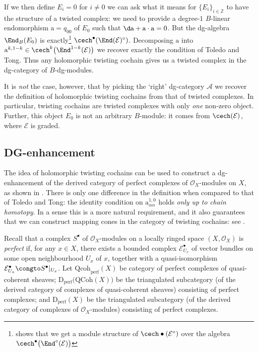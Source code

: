         If we then define $E_i=0$ for $i\neq0$ we can ask what it means for $\{E_i\}_{i\in\mathbb{Z}}$ to have the structure of a twisted complex: we need to provide a degree-$1$ $B$-linear endomorphism \mbox{$\mathrm{a}=q_{00}$} of $E_0$ such that $\d\mathrm{a}+\mathrm{a}\cdot\mathrm{a}=0$.
        But the dg-algebra $\End_B(E_0)$ is exactly\footnote{\cite[§1]{OBrian:1981vs} shows that we get a module structure of $\cech\bullet(\mathcal{E}^\circ)$ over the algebra $\cech^\bullet\big(\End^\circ(\mathcal{E})\big)$} $\cech^\bullet(\End(\mathcal{E})^\circ)$.
        Decomposing $\mathrm{a}$ into $\mathrm{a}^{k,1-k}\in\cech^k\big(\End^{1-k}(\mathcal{E})\big)$ we recover exactly the condition of Toledo and Tong.
        Thus any holomorphic twisting cochain gives us a twisted complex in the dg-category of $B$-dg-modules.

        It is \emph{not} the case, however, that by picking the `right' dg-category $\mathcal{A}$ we recover the definition of holomorphic twisting cochains from that of twisted complexes.
        In particular, twisting cochains are twisted complexes with only \emph{one} non-zero object.
        Further, this object $E_0$ is not an arbitrary $B$-module: it comes from $\cech(\mathcal{E})$, where $\mathcal{E}$ is graded.

    \subsection{DG-enhancement}\label{sub:dg-categories-from-wei}

        The idea of holomorphic twisting cochains can be used to construct a dg-enhancement of the derived category of perfect complexes of $\mathcal{O}_X$-modules on $X$, as shown in \cite{Wei:2016ip}.
        There is only one difference in the definition when compared to that of Toledo and Tong: the identity condition on $\mathrm{a}_{\alpha\alpha}^{1,0}$ holds \emph{only up to chain homotopy}.
        In a sense this is a more natural requirement, and it also guarantees that we can construct mapping cones in the category of twisting cochains: see \cite[Remark~2.15]{Wei:2016ip}.

        \bigskip

        Recall that a complex $S^\bullet$ of $\mathcal{O}_X$-modules on a locally ringed space $(X,\mathcal{O}_X)$ is \emph{perfect} if, for any $x\in X$, there exists a bounded complex $\mathcal{E}_{U_x}^\bullet$ of vector bundles on some open neighbourhood $U_x$ of $x$, together with a quasi-isomorphism \mbox{$\mathcal{E}_{U_x}^\bullet\congto S^\bullet|_{U_x}$}.
        Let $\mathrm{Qcoh}_\mathrm{perf}(X)$ be category of perfect complexes of quasi-coherent sheaves; $\mathrm{D}_\mathrm{perf}\big(\mathrm{QCoh}(X)\big)$ be the triangulated subcategory (of the derived category of complexes of quasi-coherent sheaves) consisting of perfect complexes; and $\mathrm{D}_\mathrm{perf}(X)$ be the triangulated subcategory (of the derived category of complexes of $\mathcal{O}_X$-modules) consisting of perfect complexes.

